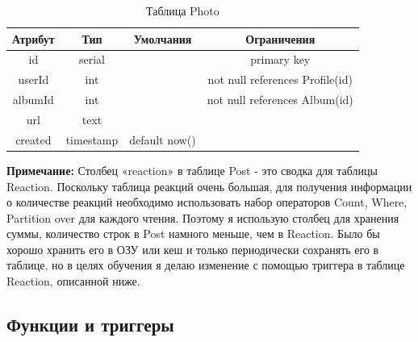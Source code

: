 \begin{table}[H]
  \centering
  \begin{tabular}{|c|c|c|c|}
      \hline
      \bfseries Атрибут & \bfseries Тип & \bfseries Умолчания & Ограничения \\
      \hline
id		&	serial &&	primary key \\
userId 	&	int		&&not null	references Profile(id)\\
albumId &	int		&&not null	references Album(id)\\
url 	&	text &&\\
created &	timestamp			&default now() &\\
      \hline
  \end{tabular}
  \caption{Таблица Photo}
\end{table}

\textbf{Примечание:}
Столбец «reaction» в таблице Post - это сводка для таблицы Reaction.
Поскольку таблица реакций очень большая, для получения информации о количестве реакций необходимо использовать набор операторов Count, Where, Partition over для каждого чтения.
Поэтому я использую столбец для хранения суммы, количество строк в Post намного меньше, чем в Reaction.
Было бы хорошо хранить его в ОЗУ или кеш и только периодически сохранять его в таблице, но в целях обучения я делаю изменение с помощью триггера в таблице Reaction, описанной ниже.


\pagebreak
\subsection*{Функции и триггеры}


